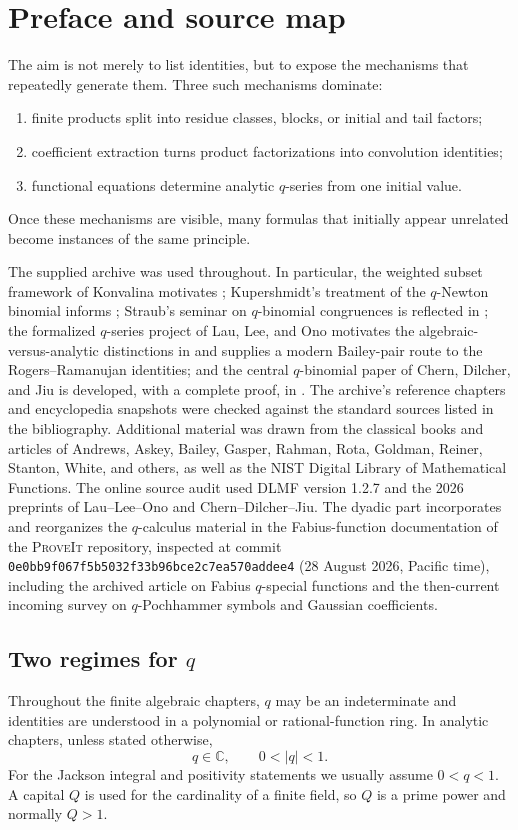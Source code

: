 \documentclass[11pt,oneside,openany]{book}
\theoremstyle{definition}
\theoremstyle{remark}
\newcommand{\C}{\mathbb C}
\newcommand{\abs}[1]{\lvert #1\rvert}
\begin{document}
\chapter*{Preface and source map}
The aim is not merely to list identities, but to expose the mechanisms that repeatedly generate them.  Three such mechanisms dominate:
\begin{enumerate}
\item finite products split into residue classes, blocks, or initial and tail factors;
\item coefficient extraction turns product factorizations into convolution identities;
\item functional equations determine analytic $q$-series from one initial value.
\end{enumerate}
Once these mechanisms are visible, many formulas that initially appear unrelated become instances of the same principle.

The supplied archive was used throughout.  In particular, the weighted subset framework of Konvalina motivates ; Kupershmidt's treatment of the $q$-Newton binomial informs ; Straub's seminar on $q$-binomial congruences is reflected in ; the formalized $q$-series project of Lau, Lee, and Ono motivates the algebraic-versus-analytic distinctions in  and supplies a modern Bailey-pair route to the Rogers--Ramanujan identities; and the central $q$-binomial paper of Chern, Dilcher, and Jiu is developed, with a complete proof, in .  The archive's reference chapters and encyclopedia snapshots were checked against the standard sources listed in the bibliography.  Additional material was drawn from the classical books and articles of Andrews, Askey, Bailey, Gasper, Rahman, Rota, Goldman, Reiner, Stanton, White, and others, as well as the NIST Digital Library of Mathematical Functions.  The online source audit used DLMF version 1.2.7 and the 2026 preprints of Lau--Lee--Ono and Chern--Dilcher--Jiu.  The dyadic part incorporates and reorganizes the $q$-calculus material in the Fabius-function documentation of the \textsc{ProveIt} repository, inspected at commit \texttt{0e0bb9f067f5b5032f33b96bce2c7ea570addee4} (28 August 2026, Pacific time), including the archived article on Fabius $q$-special functions and the then-current incoming survey on $q$-Pochhammer symbols and Gaussian coefficients.

\section*{Two regimes for $q$}
Throughout the finite algebraic chapters, $q$ may be an indeterminate and identities are understood in a polynomial or rational-function ring.  In analytic chapters, unless stated otherwise,
\[
  q\in\C,\qquad 0<\abs q<1.
\]
For the Jackson integral and positivity statements we usually assume $0<q<1$.  A capital $Q$ is used for the cardinality of a finite field, so $Q$ is a prime power and normally $Q>1$.
\end{document}
